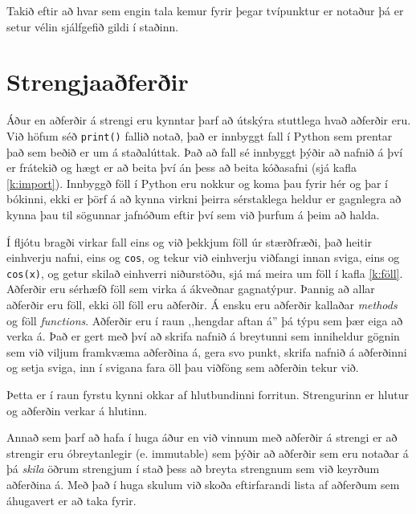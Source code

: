 Takið eftir að hvar sem engin tala kemur fyrir þegar tvípunktur er notaður þá er setur vélin sjálfgefið gildi í staðinn.

\section{Strengjaaðferðir}\label{uk:strengjaaðferðir}
Áður en aðferðir á strengi eru kynntar þarf að útskýra stuttlega hvað aðferðir eru.
Við höfum séð \texttt{print()} fallið notað, það er innbyggt fall í Python sem prentar það sem beðið er um á staðalúttak.
Það að fall sé innbyggt þýðir að nafnið á því er frátekið og hægt er að beita því án þess að beita kóðasafni (sjá kafla \ref{k:import}).
Innbyggð föll í Python eru nokkur og koma þau fyrir hér og þar í bókinni, ekki er þörf á að kynna virkni þeirra sérstaklega heldur er gagnlegra að kynna þau til sögunnar jafnóðum eftir því sem við þurfum á þeim að halda.

Í fljótu bragði virkar fall eins og við þekkjum föll úr stærðfræði, það heitir einhverju nafni, eins og \texttt{cos}, og tekur við einhverju viðfangi innan sviga, eins og \texttt{cos(x)}, og getur skilað einhverri niðurstöðu, sjá má meira um föll í kafla \ref{k:föll}.
Aðferðir eru sérhæfð föll sem virka á ákveðnar gagnatýpur.
Þannig að allar aðferðir eru föll, ekki öll föll eru aðferðir.
Á ensku eru aðferðir kallaðar \textit{methods} og föll \textit{functions}.
Aðferðir eru í raun ,,hengdar aftan á'' þá týpu sem þær eiga að verka á.
Það er gert með því að skrifa nafnið á breytunni sem inniheldur gögnin sem við viljum framkvæma aðferðina á, gera svo punkt, skrifa nafnið á aðferðinni og setja sviga, inn í svigana fara öll þau viðföng sem aðferðin tekur við.

Þetta er í raun fyrstu kynni okkar af hlutbundinni forritun.
Strengurinn er hlutur og aðferðin verkar á hlutinn.

Annað sem þarf að hafa í huga áður en við vinnum með aðferðir á strengi er að strengir eru óbreytanlegir (e. immutable) sem þýðir að aðferðir sem eru notaðar á þá \emph{skila} öðrum strengjum í stað þess að breyta strengnum sem við keyrðum aðferðina á.
Með það í huga skulum við skoða eftirfarandi lista af aðferðum sem áhugavert er að taka fyrir.
\vspace{10px}

